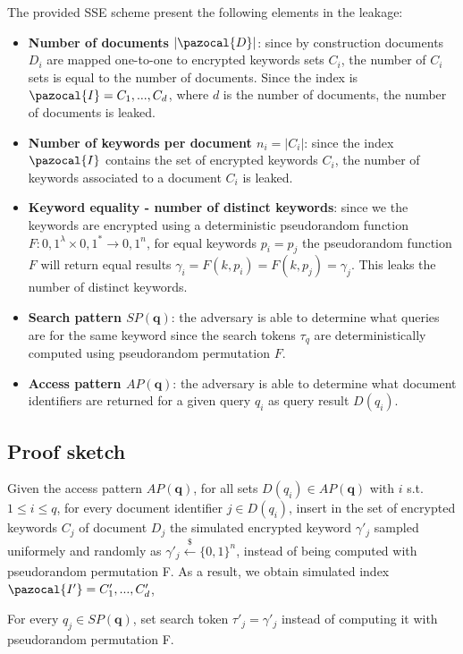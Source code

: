 The provided SSE scheme present the following elements in the leakage: 

\begin{itemize}
    \item \textbf{Number of documents $|\pazocal{D}|$}: since by construction documents $D_i$ are mapped one-to-one to encrypted keywords sets $C_i$, the number of $C_i$ sets is equal to the number of documents. Since the index is $\pazocal{I}={C_1,...,C_d}$, where $d$ is the number of documents, the number of documents is leaked.
    \item \textbf{Number of keywords per document $n_i=|C_i|$}: since the index $\pazocal{I}$ contains the set of encrypted keywords $C_i$, the number of keywords associated to a document $C_i$ is leaked.
    \item \textbf{Keyword equality - number of distinct keywords}: since we the keywords are encrypted using a deterministic pseudorandom function $F:{0,1}^\lambda \times {0,1}^* \rightarrow {0,1}^n$, for equal keywords $p_i = p_j$ the pseudorandom function $F$ will return equal results $\gamma _i=F(k,p_i)=F(k,p_j)=\gamma _j$. This leaks the number of distinct keywords.
    \item \textbf{Search pattern $SP(\textbf{q})$}: the adversary is able to determine what queries are for the same keyword since the search tokens $\tau _q$ are deterministically computed using pseudorandom permutation $F$.
    \item \textbf{Access pattern $AP(\textbf{q})$}: the adversary is able to determine what document identifiers are returned for a given query $q_i$ as query result $D(q_i)$.
\end{itemize}

\subsection{Proof sketch}

Given the access pattern $AP(\textbf{q})$, for all sets $D(q_i)\in AP(\textbf{q})$ with $i$ s.t. $1\leq i\leq q$, for every document identifier $j\in D(q_i)$, insert in the set of encrypted keywords $C_j$ of document $D_j$ the simulated encrypted keyword $\gamma '_j$ sampled uniformely and randomly as $\gamma '_j\xleftarrow[]{\text{\$}}\{0,1\}^n$, instead of being computed with pseudorandom permutation F. As a result, we obtain simulated index $\pazocal{I'}={C'_1,...,C'_d}$,

For every $q_j\in SP(\textbf{q})$, set search token $\tau '_j=\gamma '_j$ instead of computing it with pseudorandom permutation F.

